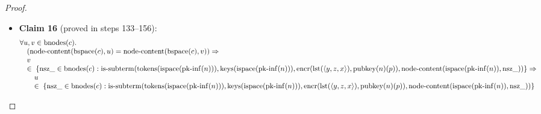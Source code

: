 \documentclass[11pt]{article}
\theoremstyle{plain}
\begin{document}
\begin{proof}
\begin{itemize}[leftmargin=2.8em, itemsep=4pt, parsep=1pt]
  \item[\textbf{132}] \textbf{Claim 16} (proved in steps 133--156):
\begin{equation*}
\begin{array}{@{}l@{}} \forall u, v \in \operatorname{bnodes}(c). \\ \quad (\operatorname{node\text{-}content}(\operatorname{bspace}(c), u) = \operatorname{node\text{-}content}(\operatorname{bspace}(c), v)) \Rightarrow  \\ \quad v \\ \quad \in\; \{\operatorname{nsz\_} \in \operatorname{bnodes}(c) : \operatorname{is\text{-}subterm}(\operatorname{tokens}(\operatorname{ispace}(\operatorname{pk\text{-}inf}(n))), \operatorname{keys}(\operatorname{ispace}(\operatorname{pk\text{-}inf}(n))), \operatorname{encr}(\operatorname{lst}(\langle y, z, x \rangle), \operatorname{pubkey}(n)(p)), \operatorname{node\text{-}content}(\operatorname{ispace}(\operatorname{pk\text{-}inf}(n)), \operatorname{nsz\_}))\} \Rightarrow \\ \quad \quad u \\ \quad \quad \in\; \{\operatorname{nsz\_} \in \operatorname{bnodes}(c) : \operatorname{is\text{-}subterm}(\operatorname{tokens}(\operatorname{ispace}(\operatorname{pk\text{-}inf}(n))), \operatorname{keys}(\operatorname{ispace}(\operatorname{pk\text{-}inf}(n))), \operatorname{encr}(\operatorname{lst}(\langle y, z, x \rangle), \operatorname{pubkey}(n)(p)), \operatorname{node\text{-}content}(\operatorname{ispace}(\operatorname{pk\text{-}inf}(n)), \operatorname{nsz\_}))\} \end{array}
\end{equation*}


\end{itemize}
\end{proof}
\end{document}
